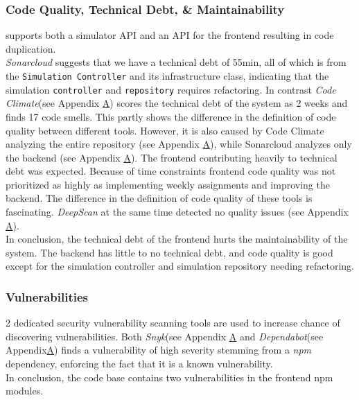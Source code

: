 \subsubsection{Code Quality, Technical Debt, \& Maintainability}
\label{subsubsec:code_quality}
\mini supports both a simulator API and an API for the frontend resulting in code duplication.\\
\textit{Sonarcloud} suggests that we have a technical debt of 55min, all of which is from the \texttt{Simulation Controller} and its infrastructure class, indicating that the simulation \texttt{controller} and \texttt{repository} requires refactoring. In contrast \textit{Code Climate}(see Appendix \hyperref[app:codeClimate]{A}) scores the technical debt of the system as 2 weeks and finds 17 code smells. This partly shows the difference in the definition of code quality between different tools. However, it is also caused by Code Climate analyzing the entire repository (see Appendix \hyperref[fig:codeClimateLangDis]{A}), while Sonarcloud analyzes only the backend (see Appendix \hyperref[fig:codeClimateLangDis]{A}). The frontend contributing heavily to technical debt was expected. Because of time constraints frontend code quality was not prioritized as highly as implementing weekly assignments and improving the backend. The difference in the definition of code quality of these tools is fascinating. \textit{DeepScan} at the same time detected no quality issues (see Appendix \hyperref[app:codeAnalDeep]{A}). \\
In conclusion, the technical debt of the frontend hurts the maintainability of the system. The backend has little to no technical debt, and code quality is good except for the simulation controller and simulation repository needing refactoring.

\subsubsection{Vulnerabilities}
2 dedicated security vulnerability scanning tools are used to increase chance of discovering vulnerabilities. Both \textit{Snyk}(see Appendix \hyperref[app:codeAnalSnyk]{A} and \textit{Dependabot}(see Appendix\hyperref[app:codeAnalDependabot]{A}) finds a vulnerability of high severity stemming from a \textit{npm} dependency, enforcing the fact that it is a known vulnerability. \\
In conclusion, the \mini code base contains two vulnerabilities in the frontend npm modules.


